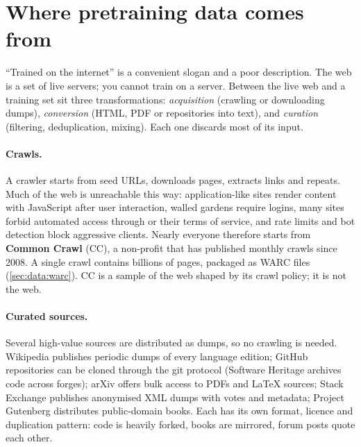 \section{Where pretraining data comes from}\label{sec:data:sources}

``Trained on the internet'' is a convenient slogan and a poor description. The web is a set of
live servers; you cannot train on a server. Between the live web and a training set sit three
transformations: \emph{acquisition} (crawling or downloading dumps), \emph{conversion} (HTML, PDF
or repositories into text), and \emph{curation} (filtering, deduplication, mixing). Each one
discards most of its input.

\paragraph{Crawls.} A crawler starts from seed URLs, downloads pages, extracts links and
repeats. Much of the web is unreachable this way: application-like sites render content with
JavaScript after user interaction, walled gardens require logins, many sites forbid automated
access through  or their terms of service, and rate limits and bot detection
block aggressive clients. Nearly everyone therefore starts from \textbf{Common Crawl} (CC), a
non-profit that has published monthly crawls since 2008. A single crawl contains billions of
pages, packaged as WARC files (\cref{sec:data:warc}). CC is a sample of the web shaped by its
crawl policy; it is not the web.

\paragraph{Curated sources.} Several high-value sources are distributed as dumps, so no crawling
is needed. Wikipedia publishes periodic dumps of every language edition; GitHub repositories can
be cloned through the git protocol (Software Heritage archives code across forges); arXiv offers
bulk access to PDFs and \LaTeX{} sources; Stack Exchange publishes anonymised XML dumps with
votes and metadata; Project Gutenberg distributes public-domain books. Each has its own format,
licence and duplication pattern: code is heavily forked, books are mirrored, forum posts quote
each other.

